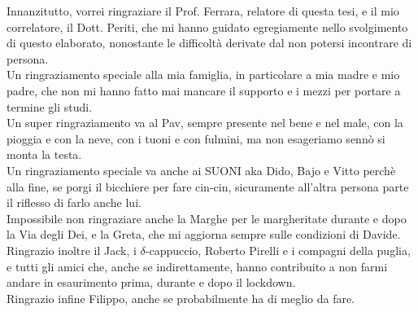 {\sl


Innanzitutto, vorrei ringraziare il Prof. Ferrara, relatore di questa tesi, e il mio correlatore, il Dott. Periti, che mi hanno guidato egregiamente nello svolgimento di questo elaborato, nonostante le difficoltà derivate dal non potersi incontrare di persona.\\

Un ringraziamento speciale alla mia famiglia, in particolare a mia madre e mio padre, che non mi hanno fatto mai mancare il supporto e i mezzi per portare a termine gli studi.
\\

Un super ringraziamento va al Pav, sempre presente nel bene e nel male, con la pioggia e con la neve, con i tuoni e con fulmini, ma non esageriamo sennò si monta la testa.\\
Un ringraziamento speciale va anche ai SUONI aka Dido, Bajo e Vitto perchè alla fine, se porgi il bicchiere per fare cin-cin, sicuramente all'altra persona parte il riflesso di farlo anche lui.\\
Impossibile non ringraziare anche la Marghe per le margheritate durante e dopo la Via degli Dei, e la Greta, che mi aggiorna sempre sulle condizioni di Davide.\\

Ringrazio inoltre il Jack, i $\delta$-cappuccio, Roberto Pirelli e i compagni della puglia, e tutti gli amici che, anche se indirettamente, hanno contribuito a non farmi andare in esaurimento prima, durante e dopo il lockdown.\\

Ringrazio infine Filippo, anche se probabilmente ha di meglio da fare.
}